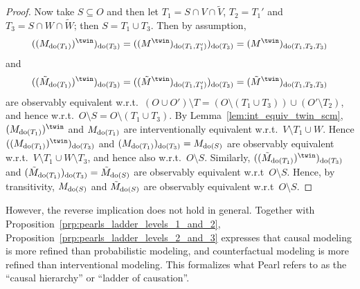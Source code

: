 \begin{proof}
  Now take $S \subseteq O$ and then let $T_1 = S \cap V \cap \tilde{V}$, $T_2 = T_1'$ and $T_3 = S \cap W \cap \tilde{W}$; then $S = T_1 \cup T_3$.
  Then by assumption,
  $$((M_{\doit(T_1)})^\twin)_{\doit(T_3)} = ((M^\twin)_{\doit(T_1,T_1')})_{\doit(T_3)} = (M^\twin)_{\doit(T_1,T_2,T_3)}$$
  and 
  $$((\tilde{M}_{\doit(T_1)})^\twin)_{\doit(T_3)} = ((\tilde{M}^\twin)_{\doit(T_1,T_1')})_{\doit(T_3)} = (\tilde{M}^\twin)_{\doit(T_1,T_2,T_3)}$$
  are observably equivalent w.r.t.\ $(O \cup O') \setminus T = (O \setminus (T_1 \cup T_3)) \cup (O' \setminus T_2)$, and hence w.r.t.\ $O \setminus S = O \setminus (T_1 \cup T_3)$.
  By Lemma~\ref{lem:int_equiv_twin_scm}, $(M_{\doit(T_1)})^\twin$ and $M_{\operatorname{do}(T_1)}$ are interventionally equivalent
  w.r.t.\ $V \setminus T_1 \cup W$. Hence
  $((M_{\doit(T_1)})^\twin)_{\doit(T_3)}$ and $(M_{\operatorname{do}(T_1)})_{\operatorname{do}(T_3)} = M_{\operatorname{do}(S)}$ are observably equivalent 
  w.r.t.\ $V \setminus T_1 \cup W \setminus T_3$, and hence also w.r.t.\ $O \setminus S$.
  Similarly, $((\tilde{M}_{\doit(T_1)})^\twin)_{\doit(T_3)}$ and $(\tilde{M}_{\operatorname{do}(T_1)})_{\operatorname{do}(T_3)} = \tilde{M}_{\operatorname{do}(S)}$ are observably equivalent w.r.t\ $O \setminus S$.
  Hence, by transitivity, $M_{\operatorname{do}(S)}$ and $\tilde{M}_{\operatorname{do}(S)}$ are observably equivalent w.r.t\ $O \setminus S$.
\end{proof}
However, the reverse implication does not hold in general. 
Together with Proposition~\ref{prp:pearls_ladder_levels_1_and_2}, Proposition~\ref{prp:pearls_ladder_levels_2_and_3} 
expresses that causal modeling is more refined than 
probabilistic modeling, and counterfactual modeling is more refined than interventional modeling.
This formalizes what Pearl refers to as the ``causal hierarchy'' or ``ladder of causation''.

